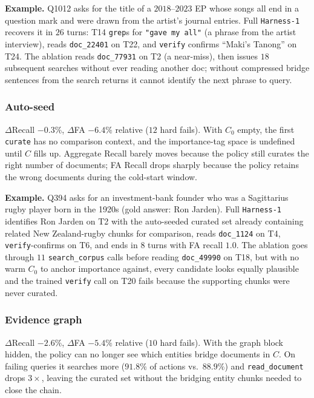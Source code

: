 \documentclass{article}
\newcommand{\sys}{\texttt{Harness-1}\xspace}
\newcommand{\verify}{\texttt{verify}\xspace}
\newcommand{\curate}{\texttt{curate}\xspace}
\begin{document}
\textbf{Example.} Q1012 asks for the title of a $2018$--$2023$ EP
whose songs all end in a question mark and were drawn from the
artist's journal entries. Full \sys recovers it in $26$ turns:
T14 \texttt{grep}s for \texttt{"gave my all"} (a phrase from
the artist interview), reads \texttt{doc\_22401} on T22, and
\verify confirms ``Maki's Tanong'' on T24. The ablation reads
\texttt{doc\_77931} on T2 (a near-miss), then issues
$18$ subsequent searches without ever reading another doc;
without compressed bridge sentences from the search returns it
cannot identify the next phrase to query.

\subsubsection{Auto-seed}
\label{app:err:auto-seed}
$\Delta$Recall $-0.3\%$, $\Delta$FA $-6.4\%$ relative
($12$ hard fails).
With $C_0$ empty, the first \curate has no comparison context,
and the importance-tag space is undefined until $C$ fills up.
Aggregate Recall barely moves because the policy still curates
the right number of documents; FA Recall drops sharply because
the policy retains the wrong documents during the cold-start
window.

\textbf{Example.} Q394 asks for an investment-bank founder who
was a Sagittarius rugby player born in the 1920s (gold answer:
Ron Jarden). Full \sys identifies Ron Jarden on T2 with the
auto-seeded curated set already containing related New
Zealand-rugby chunks for comparison, reads \texttt{doc\_1124} on
T4, \verify-confirms on T6, and ends in $8$ turns with FA
recall $1.0$. The ablation goes through $11$
\texttt{search\_corpus} calls before reading
\texttt{doc\_49990} on T18, but with no warm $C_0$ to anchor
importance against, every candidate looks equally plausible and
the trained \verify call on T20 fails because the supporting
chunks were never curated.

\subsubsection{Evidence graph}
\label{app:err:evidence-graph}
$\Delta$Recall $-2.6\%$, $\Delta$FA $-5.4\%$ relative
($10$ hard fails).
With the graph block hidden, the policy can no longer see which
entities bridge documents in $C$. On failing queries it searches
more ($91.8\%$ of actions vs.~$88.9\%$) and \texttt{read\_document}
drops $3\times$, leaving the curated set without the bridging
entity chunks needed to close the chain.
\end{document}
